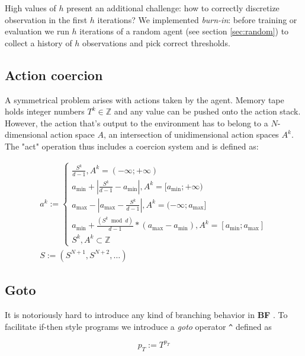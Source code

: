 High values of $h$ present an additional challenge: how to correctly discretize observation in the first $h$ iterations?
We implemented \textit{burn-in}: before training or evaluation we run $h$ iterations of a random agent (see section \ref{sec:random}) to collect a history of $h$ observations and pick correct thresholds.

\subsection{Action coercion}
\label{sec:act}

A symmetrical problem arises with actions taken by the agent. 
Memory tape holds integer numbers $T^k \in \mathbb{Z}$ and any value can be pushed onto the action stack.
However, the action that's output to the environment has to belong to a $N$-dimensional action space $A$, an intersection of unidimensional action spaces $A^k$.
The "act" operation thus includes a coercion system and is defined as:

\begin{equation}
\label{eq:act}
\begin{array}{l}
    a^k := \begin{cases}
\frac{S^k}{d-1}, A^k = (- \infty; + \infty) \\
a_{\text{min}} + |\frac{S^k}{d-1} - a_{\text{min}}|, A^k = [a_{\text{min}}; + \infty) \\
a_{\text{max}} - |a_{\text{max}} - \frac{S^k}{d-1}|, A^k = (- \infty; a_{\text{max}}] \\
a_{\text{min}} + \frac{(S^k \bmod d)}{d - 1} * (a_{\text{max}} - a_{\text{min}}), A^k = [a_{\text{min}}; a_{\text{max}}] \\
S^k, A^k \subset \mathbb{Z}
\end{cases} \\
    S := (S^{N+1}, S^{N+2}, \dots)
\end{array}
\end{equation}

\subsection{Goto}
\label{sec:goto}

It is notoriously hard to introduce any kind of branching behavior in \textbf{BF} \cite{brainfuck-control}.
To facilitate if-then style programs we introduce a \textit{goto} operator \verb|^| defined as 

\begin{equation}
   p_T := T^{p_T} 
\end{equation}

